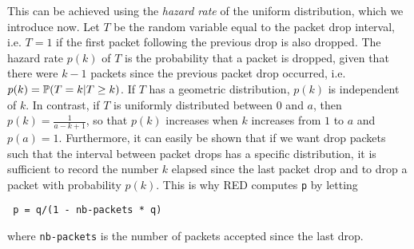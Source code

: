 This can be achieved using the \emph{hazard rate} of the uniform distribution, which we introduce now. Let $T$ be the random variable equal to the packet
drop interval, i.e. $T=1$ if the first packet following the
previous drop is also dropped. The hazard rate $p(k)$ of $T$ is the probability that
a packet is dropped, given that there were $k-1$ packets since the previous packet drop occurred, i.e. $ p(k) = \P(T=k | T \geq k)$. If $T$ has a geometric distribution, $p(k)$ is independent of $k$. In contrast, if $T$ is uniformly distributed between $0$ and $a$, then $p(k)=\frac{1}{a-k+1}$, so that $p(k)$ increases when $k$ increases from $1$ to $a$ and $p(a)=1$. Furthermore, it can easily be shown that if we want drop packets such that the interval between packet drops has a specific distribution, it is sufficient to record the number $k$ elapsed since the last packet drop and to drop a packet with probability $p(k)$.
%
%
%
%
%
%
This is why RED computes \texttt{p} by letting
 \begin{verbatim}
 p = q/(1 - nb-packets * q)
  \end{verbatim}%
 where \texttt{nb-packets} is the number of packets accepted since the last
 drop.

